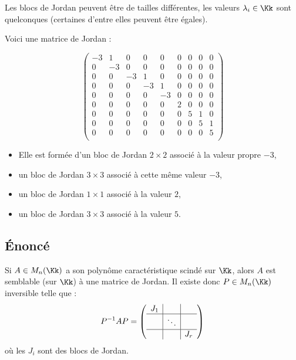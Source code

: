 \documentclass[12pt, class=report,crop=false]{standalone}
\begin{document}
Les blocs de Jordan peuvent être de tailles différentes, 
les valeurs $\lambda_i \in \Kk$ sont quelconques (certaines d'entre elles peuvent être égales).

\begin{exemple}
Voici une matrice de Jordan : 



\[
\left(\begin{array}{cc|ccc|c|ccc}
-3	&	1	&	0	&	0	&	0	&	0	&	0	&	0	&	0\\
0	&	-3	&	0	&	0	&	0	&	0	&	0	&	0	&	0\\ \hline
0	&	0	&	-3	&	1	&	0	&	0	&	0	&	0	&	0\\
0	&	0	&	0	&	-3	& 	1	&	0	&	0	&	0	&	0\\
0	&	0	&	0	&	0	& 	-3	&	0	&	0	&	0	&	0\\ \hline
0	&	0	&	0	&	0	& 	0	&	2	&	0	&	0	&	0\\ \hline
0	&	0	&	0	&	0	&	0	&	0	&	5	&	1	&	0\\
0	&	0	&	0	&	0	&	0	&	0	&	0	&	5	& 	1\\
0	&	0	&	0	&	0	&	0	&	0	&	0	&	0	& 	5\\
\end{array}\right)
\]

\bigskip

\begin{itemize}
  \item Elle est formée d'un bloc de Jordan $2 \times 2$ associé à la valeur propre $-3$,
  \item un bloc de Jordan $3 \times 3$ associé à cette même valeur $-3$, 
  \item un bloc de Jordan $1 \times 1$ associé à la valeur $2$, 
  \item un bloc de Jordan $3 \times 3$ associé à la valeur $5$. 
\end{itemize}
\end{exemple}



\subsection{\'Enoncé}

\begin{theoreme}
Si $A \in M_n(\Kk)$ a son polynôme caractéristique scindé sur $\Kk$, alors $A$ est semblable (sur $\Kk$) à une matrice de Jordan. Il existe donc $P \in M_n(\Kk)$ inversible telle que :
\[ P^{-1}AP = \left(\begin{array}{c|c|c}
J_1&&\\\hline
&\ddots&\\\hline
&&J_r
\end{array}\right)\]
où les $J_i$ sont des blocs de Jordan.
\end{theoreme}
\end{document}
